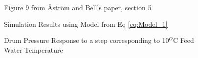         \begin{figure}[ht]
            \begin{center}
                
                Figure 9 from \r{A}str\"{o}m and Bell's paper, section 5 \cite{Astrom}
                
                
                Simulation Results using Model from Eq \eqref{eq:Model_1}
                
                \caption{Drum Pressure Response to a step corresponding to 10$^O$C Feed Water Temperature}
                \label{fig:Fig9D}
            \end{center}
        \end{figure}  %
